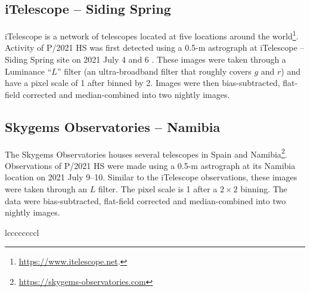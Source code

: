 \documentclass[modern]{aastex631}
\begin{document}
\begin{CJK*}{UTF8}{gbsn}
\subsection{iTelescope -- Siding Spring}

iTelescope is a network of telescopes located at five locations around the world\footnote{\url{https://www.itelescope.net}.}. Activity of P/2021 HS was first detected using a 0.5-m astrograph at iTelescope -- Siding Spring site on 2021 July 4 and 6 \citep{CBET5043}. These images were taken through a Luminance ``$L$'' filter (an ultra-broadband filter that roughly covers $g$ and $r$) and have a pixel scale of 1 after binned by 2. Images were then bias-subtracted, flat-field corrected and median-combined into two nightly images.

\subsection{Skygems Observatories -- Namibia}

The Skygems Observatories houses several telescopes in Spain and Namibia\footnote{\url{https://skygems-observatories.com}}. Observations of P/2021 HS were made using a 0.5-m astrograph at its Namibia location on 2021 July 9--10. Similar to the iTelescope observations, these images were taken through an $L$ filter. The pixel scale is 1 after a $2\times2$ binning. The data were bias-subtracted, flat-field corrected and median-combined into two nightly images.

\begin{longrotatetable}
\begin{deluxetable*}{lccccccccl}
\label{tbl:obs}


\end{deluxetable*}
\end{longrotatetable}
\end{CJK*}
\end{document}
